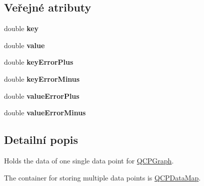 \subsection*{Veřejné atributy}
\begin{DoxyCompactItemize}
\item 
\hypertarget{classQCPData_a2f5ba9aca61bb74f88516e148a4cf71b}{}double {\bfseries key}\label{classQCPData_a2f5ba9aca61bb74f88516e148a4cf71b}

\item 
\hypertarget{classQCPData_aefe1ecf8fa2e34ed875b67523e542373}{}double {\bfseries value}\label{classQCPData_aefe1ecf8fa2e34ed875b67523e542373}

\item 
\hypertarget{classQCPData_ae468c3808107c2fd23052481156ab5b5}{}double {\bfseries key\+Error\+Plus}\label{classQCPData_ae468c3808107c2fd23052481156ab5b5}

\item 
\hypertarget{classQCPData_af107d650b8ee5c3b2961ecddcfb1bccb}{}double {\bfseries key\+Error\+Minus}\label{classQCPData_af107d650b8ee5c3b2961ecddcfb1bccb}

\item 
\hypertarget{classQCPData_ad26912552d03485ea20d91dcad16aa8f}{}double {\bfseries value\+Error\+Plus}\label{classQCPData_ad26912552d03485ea20d91dcad16aa8f}

\item 
\hypertarget{classQCPData_a51d8f42bf4d49a1f263531e70cadd6a3}{}double {\bfseries value\+Error\+Minus}\label{classQCPData_a51d8f42bf4d49a1f263531e70cadd6a3}

\end{DoxyCompactItemize}


\subsection{Detailní popis}
Holds the data of one single data point for \hyperlink{classQCPGraph}{Q\+C\+P\+Graph}. 

The container for storing multiple data points is \hyperlink{qcustomplot_8h_a84a9c4a4c2216ccfdcb5f3067cda76e3}{Q\+C\+P\+Data\+Map}.


